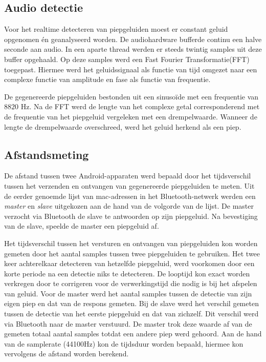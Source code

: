 \documentclass[12pt]{article}
\begin{document}
\subsection{Audio detectie}
Voor het realtime detecteren van piepgeluiden moest er constant geluid opgenomen \'en geanalyseerd worden. De audiohardware bufferde continu een halve seconde aan audio. In een aparte thread werden er steeds twintig samples uit deze buffer opgehaald. Op deze samples werd een Fast Fourier Transformatie(FFT) \cite{bracewell1986fourier} toegepast. Hiermee werd het geluidssignaal als functie van tijd omgezet naar een complexe functie van amplitude en fase als functie van frequentie. 

De gegenereerde piepgeluiden bestonden uit een sinuso\"ide met een frequentie van $8820$ Hz. Na de FFT werd de lengte van het complexe getal corresponderend met de frequentie van het piepgeluid vergeleken met een drempelwaarde. Wanneer de lengte de drempelwaarde overschreed, werd het geluid herkend als een piep.

\subsection{Afstandsmeting}
De afstand tussen twee Android-apparaten werd bepaald door het tijdsverschil tussen het verzenden en ontvangen van gegenereerde piepgeluiden te meten. Uit de eerder genoemde lijst van mac-adressen in het Bluetooth-netwerk werden een \textit{master} en \textit{slave} uitgekozen aan de hand van de volgorde van de lijst. De master verzocht via Bluetooth de slave te antwoorden op zijn piepgeluid. Na bevestiging van de slave, speelde de master een piepgeluid af.

Het tijdsverschil tussen het versturen en ontvangen van piepgeluiden kon worden gemeten door het aantal samples tussen twee piepgeluiden te gebruiken. Het twee keer achterelkaar detecteren van hetzelfde piepgeluid, werd voorkomen door een korte periode na een detectie niks te detecteren. De looptijd kon exact worden verkregen door te corrigeren voor de verwerkingstijd die nodig is bij het afspelen van geluid. Voor de master werd het aantal samples tussen de detectie van zijn eigen piep en dat van de respons gemeten. Bij de slave werd het verschil gemeten tussen de detectie van het eerste piepgeluid en dat van zichzelf. Dit verschil werd via Bluetooth naar de master verstuurd. De master trok deze waarde af van de gemeten totaal aantal samples totdat een andere piep werd gehoord. Aan de hand van de samplerate (44100Hz) kon de tijdsduur worden bepaald, hiermee kon vervolgens de afstand worden berekend.
\end{document}

